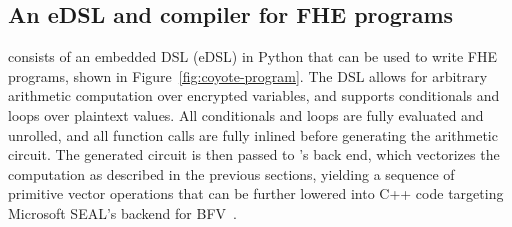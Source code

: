 
\subsection{An eDSL and compiler for FHE programs}\label{sec:surface-language}
\system consists of an embedded DSL (eDSL) in Python that can be used to write FHE programs, shown in Figure~\ref{fig:coyote-program}.
The DSL allows for arbitrary arithmetic computation over encrypted variables, and supports conditionals and loops over plaintext values. 
All conditionals and loops are fully evaluated and unrolled, and all function calls are fully inlined before generating the arithmetic circuit.
The generated circuit is then passed to \system's back end, which vectorizes the computation as described in the previous sections, yielding a sequence of primitive vector operations that can be further lowered into C++ code targeting Microsoft SEAL's backend for BFV~\cite{seal}.

